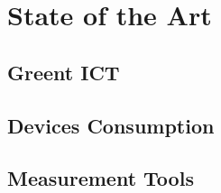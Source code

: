 

\chapter{State of the Art} \label{chap2:state_of_the_art}

\section{Greent ICT} \label{sec2:green_ict}

\section{Devices Consumption} \label{sec2:devices_consumption} 

\section{Measurement Tools} \label{sec2:tools}

